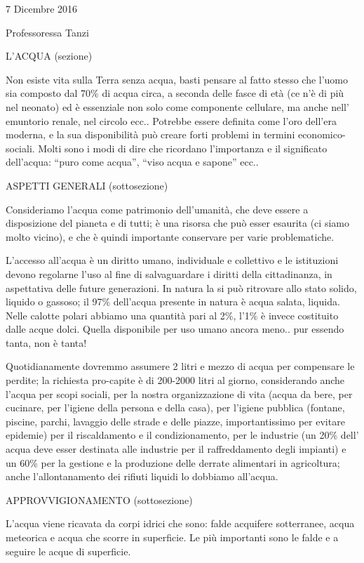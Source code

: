 \documentclass[]{article}
\date{}
\begin{document}
7 Dicembre 2016

Professoressa Tanzi

L'ACQUA (sezione)

Non esiste vita sulla Terra senza acqua, basti pensare al fatto stesso
che l'uomo sia composto dal 70\% di acqua circa, a seconda delle fasce
di età (ce n'è di più nel neonato) ed è essenziale non solo come
componente cellulare, ma anche nell' emuntorio renale, nel circolo ecc..
Potrebbe essere definita come l'oro dell'era moderna, e la sua
disponibilità può creare forti problemi in termini economico-sociali.
Molti sono i modi di dire che ricordano l'importanza e il significato
dell'acqua: ``puro come acqua'', ``viso acqua e sapone'' ecc..

ASPETTI GENERALI (sottosezione)

Consideriamo l'acqua come patrimonio dell'umanità, che deve essere a
disposizione del pianeta e di tutti; è una risorsa che può esser
esaurita (ci siamo molto vicino), e che è quindi importante conservare
per varie problematiche.

L'accesso all'acqua è un diritto umano, individuale e collettivo e le
istituzioni devono regolarne l'uso al fine di salvaguardare i diritti
della cittadinanza, in aspettativa delle future generazioni. In natura
la si può ritrovare allo stato solido, liquido o gassoso; il 97\%
dell'acqua presente in natura è acqua salata, liquida. Nelle calotte
polari abbiamo una quantità pari al 2\%, l'1\% è invece costituito dalle
acque dolci. Quella disponibile per uso umano ancora meno.. pur essendo
tanta, non è tanta!

Quotidianamente dovremmo assumere 2 litri e mezzo di acqua per
compensare le perdite; la richiesta pro-capite è di 200-2000 litri al
giorno, considerando anche l'acqua per scopi sociali, per la nostra
organizzazione di vita (acqua da bere, per cucinare, per l'igiene della
persona e della casa), per l'igiene pubblica (fontane, piscine, parchi,
lavaggio delle strade e delle piazze, importantissimo per evitare
epidemie) per il riscaldamento e il condizionamento, per le industrie
(un 20\% dell' acqua deve esser destinata alle industrie per il
raffreddamento degli impianti) e un 60\% per la gestione e la produzione
delle derrate alimentari in agricoltura; anche l'allontanamento dei
rifiuti liquidi lo dobbiamo all'acqua.

APPROVVIGIONAMENTO (sottosezione)

L'acqua viene ricavata da corpi idrici che sono: falde acquifere
sotterranee, acqua meteorica e acqua che scorre in superficie. Le più
importanti sono le falde e a seguire le acque di superficie.
\end{document}
